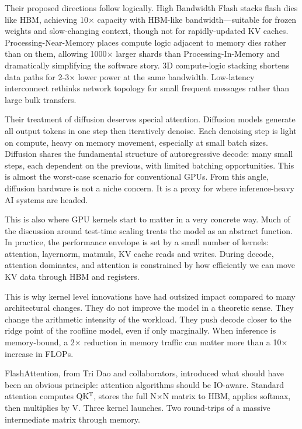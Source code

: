 \documentclass[12pt]{article}
\begin{document}
Their proposed directions follow logically. High Bandwidth Flash stacks flash dies like HBM, achieving 10$\times$ capacity with HBM-like bandwidth---suitable for frozen weights and slow-changing context, though not for rapidly-updated KV caches. Processing-Near-Memory places compute logic adjacent to memory dies rather than on them, allowing 1000$\times$ larger shards than Processing-In-Memory and dramatically simplifying the software story. 3D compute-logic stacking shortens data paths for 2-3$\times$ lower power at the same bandwidth. Low-latency interconnect rethinks network topology for small frequent messages rather than large bulk transfers.

Their treatment of diffusion deserves special attention. Diffusion models generate all output tokens in one step then iteratively denoise. Each denoising step is light on compute, heavy on memory movement, especially at small batch sizes. Diffusion shares the fundamental structure of autoregressive decode: many small steps, each dependent on the previous, with limited batching opportunities. This is almost the worst-case scenario for conventional GPUs. From this angle, diffusion hardware is not a niche concern. It is a proxy for where inference-heavy AI systems are headed.

This is also where GPU kernels start to matter in a very concrete way. Much of the discussion around test-time scaling treats the model as an abstract function. In practice, the performance envelope is set by a small number of kernels: attention, layernorm, matmuls, KV cache reads and writes. During decode, attention dominates, and attention is constrained by how efficiently we can move KV data through HBM and registers.

This is why kernel level innovations have had outsized impact compared to many architectural changes. They do not improve the model in a theoretic sense. They change the arithmetic intensity of the workload. They push decode closer to the ridge point of the roofline model, even if only marginally. When inference is memory-bound, a 2$\times$ reduction in memory traffic can matter more than a 10$\times$ increase in FLOPs.

FlashAttention, from Tri Dao and collaborators, introduced what should have been an obvious principle: attention algorithms should be IO-aware. Standard attention computes QK$^\text{T}$, stores the full N$\times$N matrix to HBM, applies softmax, then multiplies by V. Three kernel launches. Two round-trips of a massive intermediate matrix through memory.
\end{document}
